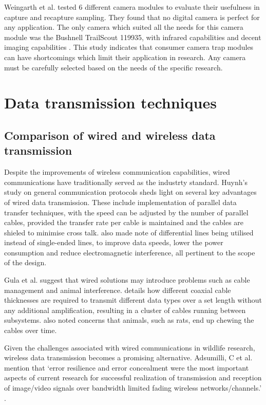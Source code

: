 \documentclass[class=report,11pt,crop=false]{standalone}
\begin{document}
Weingarth et al. \cite{weingarth2013evaluation} tested 6 different camera modules to evaluate their usefulness in capture and recapture sampling. They found that no digital camera is perfect for any application. The only camera which suited all the needs for this camera module was the Bushnell TrailScout 119935, with infrared capabilities and decent imaging capabilities \cite{weingarth2013evaluation}. This study indicates that consumer camera trap modules can have shortcomings which limit their application in research. Any camera must be carefully selected based on the needs of the specific research.

\section{Data transmission techniques}

\subsection{Comparison of wired and wireless data transmission}

Despite the improvements of wireless communication capabilities, wired communications have traditionally served as the industrty standard. Huynh’s study on general communication protocols \cite{huynh2010study} sheds light on several key advantages of wired data transmission. These include implementation of parallel data transfer techniques, with the speed can be adjusted by the number of parallel cables, provided the transfer rate per cable is maintained and the cables are shieled to minimise cross talk. \cite{huynh2010study} also made note of differential lines being utilised instead of single-ended lines, to improve data speeds, lower the power consumption and reduce electromagnetic interference, all pertinent to the scope of the design.

Gula et al. suggest that wired solutions may introduce problems such as cable management and animal interference. \cite{gula2010audio} details how different coaxial cable thicknesses are required to transmit different data types over a set length without any additional amplification, resulting in a cluster of cables running between subsystems. \cite{gula2010audio} also noted concerns that animals, such as rats, end up chewing the cables over time. 

Given the challenges associated with wired communications in wildlife research, wireless data transmission becomes a promising alternative. Adsumilli, C et al.  mention that ‘error resilience and error concealment were the most important aspects of current research for successful realization of transmission and reception of image/video signals over bandwidth limited fading wireless networks/channels.’ \cite{adsumilli2002adaptive}. %
\end{document}
